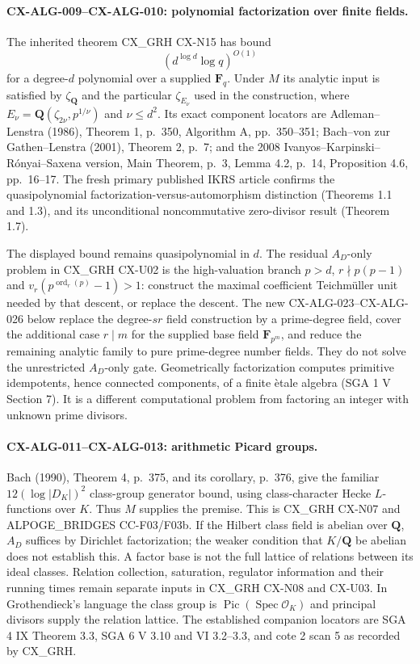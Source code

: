 \documentclass[11pt,a4paper]{article}
\begin{document}
\paragraph{CX-ALG-009--CX-ALG-010: polynomial factorization over finite fields.}
The inherited theorem CX\_GRH CX-N15 has bound
\[
                 (d^{\log d}\log q)^{O(1)}
\]
for a degree-$d$ polynomial over a supplied $\mathbf F_q$. Under $M$ its
analytic input is satisfied by $\zeta_{\mathbf Q}$ and the particular
$\zeta_{E_\nu}$ used in the construction, where
$E_\nu=\mathbf Q(\zeta_{2\nu},p^{1/\nu})$ and $\nu\leq d^2$.
Its exact component locators are Adleman--Lenstra (1986), Theorem 1, p.~350,
Algorithm A, pp.~350--351; Bach--von zur Gathen--Lenstra (2001), Theorem 2,
p.~7; and the 2008 Ivanyos--Karpinski--R\'onyai--Saxena version, Main Theorem,
p.~3, Lemma 4.2, p.~14, Proposition 4.6, pp.~16--17.
The fresh primary published IKRS article confirms the quasipolynomial
factorization-versus-automorphism distinction (Theorems 1.1 and 1.3), and
its unconditional noncommutative zero-divisor result (Theorem 1.7).

The displayed bound remains quasipolynomial in $d$. The residual $A_D$-only
problem in CX\_GRH CX-U02 is the high-valuation branch
$p>d$, $r\nmid p(p-1)$ and
$v_r(p^{\operatorname{ord}_r(p)}-1)>1$: construct the maximal coefficient
Teichm\"uller unit needed by that descent, or replace the descent. The new
CX-ALG-023--CX-ALG-026 below replace the degree-$sr$ field construction by
a prime-degree field, cover the additional case $r\mid m$ for the supplied
base field $\mathbf F_{p^m}$, and reduce the remaining analytic family to
pure prime-degree number fields. They do not solve the unrestricted
$A_D$-only gate. Geometrically factorization computes
primitive idempotents, hence connected components, of a finite \`etale
algebra (SGA 1 V Section 7). It is a different computational problem from
factoring an integer with unknown prime divisors.

\paragraph{CX-ALG-011--CX-ALG-013: arithmetic Picard groups.}
Bach (1990), Theorem 4, p.~375, and its corollary, p.~376, give the familiar
$12(\log|D_K|)^2$ class-group generator bound, using class-character Hecke
$L$-functions over $K$. Thus $M$ supplies the premise. This is CX\_GRH
CX-N07 and ALPOGE\_BRIDGES CC-F03/F03b. If the Hilbert class field is
abelian over $\mathbf Q$, $A_D$ suffices by Dirichlet factorization; the
weaker condition that $K/\mathbf Q$ be abelian does not establish this.
A factor base is not the full lattice of relations between its ideal
classes. Relation collection, saturation, regulator information and their
running times remain separate inputs in CX\_GRH CX-N08 and CX-U03.
In Grothendieck's language the class group is
$\operatorname{Pic}(\operatorname{Spec}\mathcal O_K)$ and principal divisors
supply the relation lattice. The established companion locators are SGA 4
IX Theorem 3.3, SGA 6 V 3.10 and VI 3.2--3.3, and cote 2 scan 5 as recorded
by CX\_GRH.
\end{document}
